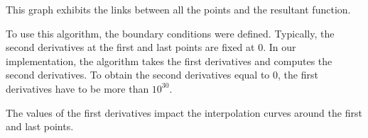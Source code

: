 This graph exhibits the links between all the points and the resultant function.

\bigskip

To use this algorithm, the boundary conditions were defined. Typically, the second derivatives at the first and last points are fixed at 0. In our implementation, the algorithm takes the first derivatives and computes the second derivatives. To obtain the second derivatives equal to 0, the first derivatives have to be more than $10^{30}$.

The values of the first derivatives impact the interpolation curves around the first and last points.
